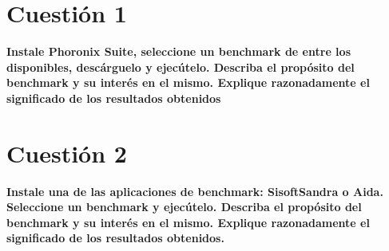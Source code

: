 \documentclass[a4paper,10pt]{article}
\newenvironment{answer}{%
\begin{list}{}{%
}%
\item[]}{\end{list}}
\newcommand{\imagent}[4]{
  \begin{figure}
    \begin{center}
    \texttt{[image: \#1]}
    \end{center}
    \caption{#3}
    \label{#4}
  \end{figure}
}
\newcommand{\imagen}[4]{
  \begin{minipage}{\linewidth}
    \centering
    \texttt{[image: \#1]}
    \captionof{figure}{#2}
    \label{#3}
  \end{minipage} 
}
\begin{document}
\newpage
\tableofcontents
\newpage

\section{Cuestión 1}
\textbf{Instale Phoronix Suite, seleccione un benchmark de entre los disponibles, descárguelo y ejecútelo. Describa el 
  propósito del benchmark y su interés en el mismo. Explique razonadamente el significado de los resultados
  obtenidos}
\begin{answer}
 
\end{answer}

\section{Cuestión 2}
\textbf{Instale una de las aplicaciones de benchmark: SisoftSandra o Aida. Seleccione un benchmark y ejecútelo.
  Describa el propósito del benchmark y su interés en el mismo. Explique razonadamente el significado de los
  resultados obtenidos.}
\begin{answer}
 
\end{answer}
\end{document}
